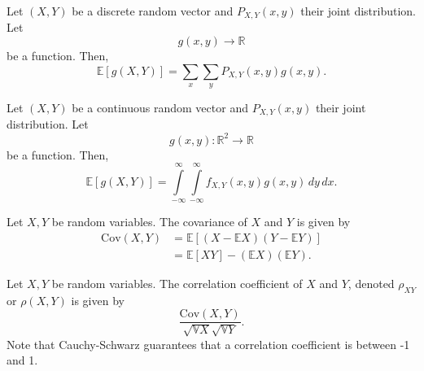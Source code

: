 \documentclass{article}
\begin{document}
\medskip
{}

    Let $(X,Y)$ be a discrete random vector and $P_{X,Y}(x,y)$ their joint distribution. Let $$g(x,y) \to \mathbb R$$ be a function. Then, $$\mathbb E[g(X,Y)] = \sum_x\sum_yP_{X,Y}(x,y)g(x,y).$$

\medskip
{}

    Let $(X,Y)$ be a continuous random vector and $P_{X,Y}(x,y)$ their joint distribution. Let $$g(x,y) : \mathbb R^2 \to \mathbb R$$ be a function. Then, $$\mathbb E[g(X,Y)] = \int\limits_{-\infty}^\infty \int\limits_{-\infty}^\infty f_{X,Y}(x,y)g(x,y)\,dy\,dx.$$

\medskip
{}

    Let $X,Y$ be random variables. The covariance of $X$ and $Y$ is given by
    \begin{align*}
        \text{Cov}(X,Y) &= \mathbb E[(X-\mathbb EX)(Y-\mathbb EY)] \\
                        &= \mathbb E[XY] - (\mathbb EX)(\mathbb EY).
    \end{align*}

\medskip
{}

    Let $X,Y$ be random variables. The correlation coefficient of $X$ and $Y$, denoted $\rho_{XY}$ or $\rho(X,Y)$ is given by $$\frac{\text{Cov}(X,Y)}{\sqrt{\mathbb VX}\sqrt{\mathbb VY}}.$$ Note that Cauchy-Schwarz guarantees that a correlation coefficient is between -1 and 1.
\end{document}

